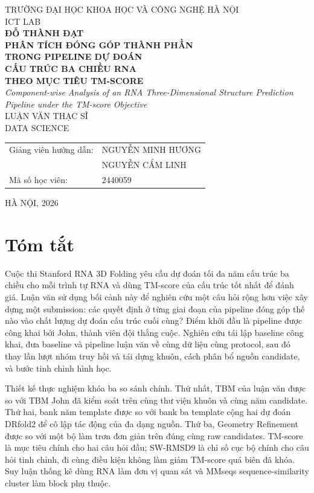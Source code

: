 \documentclass[12pt,a4paper,oneside]{report}
\begin{document}
\begin{titlepage}
\begin{center}
  {\large TRƯỜNG ĐẠI HỌC KHOA HỌC VÀ CÔNG NGHỆ HÀ NỘI}\\[0.25cm]
  {\large ICT LAB}\\[1.6cm]
  {\Large\bfseries ĐỖ THÀNH ĐẠT}\\[1.5cm]
  {\Large\bfseries
  PHÂN TÍCH ĐÓNG GÓP THÀNH PHẦN\\
  TRONG PIPELINE DỰ ĐOÁN\\
  CẤU TRÚC BA CHIỀU RNA\\
  THEO MỤC TIÊU TM-SCORE
  }\\[1.0cm]
  {\large\itshape
  Component-wise Analysis of an RNA Three-Dimensional Structure Prediction
  Pipeline under the TM-score Objective
  }\\[1.5cm]
  {\large LUẬN VĂN THẠC SĨ}\\[0.5cm]
  {\large DATA SCIENCE}\\[1.6cm]
  \begin{tabularx}{0.94\textwidth}{lX}
  Giảng viên hướng dẫn: & NGUYỄN MINH HƯƠNG\\
  & NGUYỄN CẨM LINH\\
  Mã số học viên: & 2440059
  \end{tabularx}
  \vfill
  {\large HÀ NỘI, 2026}
\end{center}
\end{titlepage}


\chapter*{Tóm tắt}

Cuộc thi Stanford RNA 3D Folding yêu cầu dự đoán tối đa năm cấu trúc ba chiều cho mỗi
trình tự RNA và dùng TM-score của cấu trúc tốt nhất để đánh giá. Luận văn sử dụng bối
cảnh này để nghiên cứu một câu hỏi rộng hơn việc xây dựng một submission: các quyết
định ở từng giai đoạn của pipeline đóng góp thế nào vào chất lượng dự đoán cấu trúc
cuối cùng? Điểm khởi đầu là pipeline được công khai bởi John, thành viên đội thắng cuộc.
Nghiên cứu tái lập baseline công khai, đưa baseline và pipeline luận văn về cùng dữ
liệu cùng protocol, sau đó thay lần lượt nhóm truy hồi và tái dựng khuôn, cách phân bổ
nguồn candidate, và bước tinh chỉnh hình học.

Thiết kế thực nghiệm khóa ba so sánh chính. Thứ nhất, TBM của luận văn được so với TBM
John đã kiểm soát trên cùng thư viện khuôn và cùng năm candidate. Thứ hai, bank năm
template được so với bank ba template cộng hai dự đoán DRfold2 để cô lập tác động của
đa dạng nguồn. Thứ ba, Geometry Refinement được so với một bộ làm trơn đơn giản trên
đúng cùng raw candidates. TM-score là mục tiêu chính cho hai câu hỏi đầu; SW-RMSD9 là
chỉ số cục bộ chính cho câu hỏi tinh chỉnh, đi cùng điều kiện không làm giảm TM-score
quá biên đã khóa. Suy luận thống kê dùng RNA làm đơn vị quan sát và MMseqs
sequence-similarity cluster làm block phụ thuộc.
\end{document}
